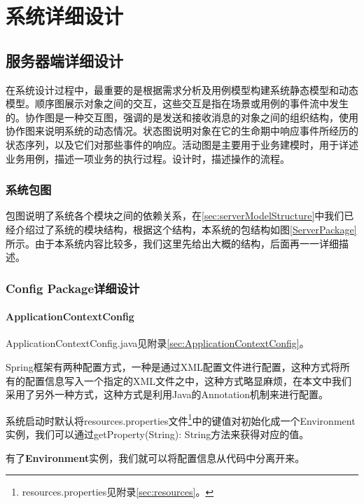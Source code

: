
\chapter{系统详细设计}
\section{服务器端详细设计}
在系统设计过程中，最重要的是根据需求分析及用例模型构建系统静态模型和动态模型。顺序图展示对象之间的交互，这些交互是指在场景或用例的事件流中发生的。协作图是一种交互图，强调的是发送和接收消息的对象之间的组织结构，使用协作图来说明系统的动态情况。状态图说明对象在它的生命期中响应事件所经历的状态序列，以及它们对那些事件的响应。活动图是主要用于业务建模时，用于详述业务用例，描述一项业务的执行过程。设计时，描述操作的流程\cite{zhanghaipan1998}。

\subsection{系统包图}
包图说明了系统各个模块之间的依赖关系，在\ref{sec:serverModelStructure}中我们已经介绍过了系统的模块结构，根据这个结构，本系统的包结构如图\ref{ServerPackage}所示。由于本系统内容比较多，我们这里先给出大概的结构，后面再一一详细描述。

\subsection{Config Package详细设计}


\subsubsection{ApplicationContextConfig}
ApplicationContextConfig.java见附录\ref{sec:ApplicationContextConfig}。

Spring框架有两种配置方式，一种是通过XML配置文件进行配置，这种方式将所有的配置信息写入一个指定的XML文件之中，这种方式略显麻烦，在本文中我们采用了另外一种方式，这种方式是利用Java的Annotation机制来进行配置。

系统启动时默认将resources.properties文件\footnote{resources.properties见附录\ref{sec:resources}。}中的键值对初始化成一个Environment实例，我们可以通过getProperty(String): String方法来获得对应的值。

有了\textbf{Environment}实例，我们就可以将配置信息从代码中分离开来。


